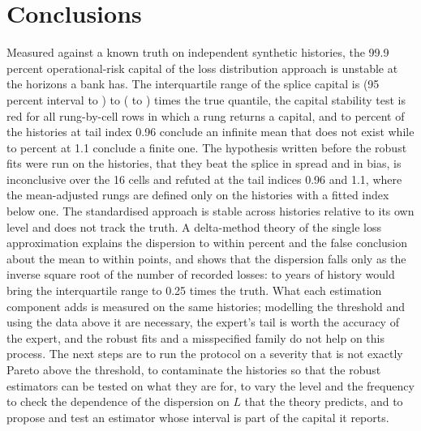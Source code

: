 \section{Conclusions}
\label{sec:conclusions}

Measured against a known truth on \nHist{} independent synthetic histories, the 99.9 percent operational-risk capital of the loss distribution approach is unstable at the horizons a bank has. The interquartile range of the splice capital is \spIqrMin{} (95 percent interval \spMinLo{} to \spMinHi{}) to \spIqrMax{} (\spMaxLo{} to \spMaxHi{}) times the true quantile, the capital stability test is red for all \redTotal{} rung-by-cell rows in which a rung returns a capital, and \infLo{} to \infHi{} percent of the histories at tail index 0.96 conclude an infinite mean that does not exist while \finLo{} to \finHi{} percent at 1.1 conclude a finite one.
The hypothesis written before the robust fits were run on the histories, that they beat the splice in spread and in bias, is inconclusive over the 16 cells and refuted at the tail indices 0.96 and 1.1, where the mean-adjusted rungs are defined only on the histories with a fitted index below one. The standardised approach is stable across histories relative to its own level and does not track the truth. A delta-method theory of the single loss approximation explains the dispersion to within \thSdMaxErr{} percent and the false conclusion about the mean to within \thShareMaxErr{} points, and shows that the dispersion falls only as the inverse square root of the number of recorded losses: \yrsMin{} to \yrsMax{} years of history would bring the interquartile range to 0.25 times the truth. What each estimation component adds is measured on the same histories; modelling the threshold and using the data above it are necessary, the expert's tail is worth the accuracy of the expert, and the robust fits and a misspecified family do not help on this process.
The next steps are to run the protocol on a severity that is not exactly Pareto above the threshold, to contaminate the histories so that the robust estimators can be tested on what they are for, to vary the level and the frequency to check the dependence of the dispersion on $L$ that the theory predicts, and to propose and test an estimator whose interval is part of the capital it reports.
